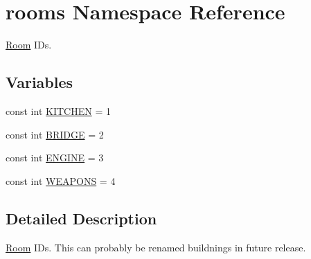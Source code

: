 \hypertarget{namespacerooms}{\section{rooms Namespace Reference}
\label{namespacerooms}
}


\hyperlink{classRoom}{Room} I\-Ds.  


\subsection*{Variables}
\begin{DoxyCompactItemize}
\item 
const int \hyperlink{namespacerooms_af442e0eb93ff764fd8719778cf57198c}{K\-I\-T\-C\-H\-E\-N} = 1
\item 
const int \hyperlink{namespacerooms_af6e6156e1e069732b4a871a08c0a0764}{B\-R\-I\-D\-G\-E} = 2
\item 
const int \hyperlink{namespacerooms_adb86c88291085e8000065eb5ded8d372}{E\-N\-G\-I\-N\-E} = 3
\item 
const int \hyperlink{namespacerooms_a70b442e599b3d5be772a5288cfc8ce71}{W\-E\-A\-P\-O\-N\-S} = 4
\end{DoxyCompactItemize}


\subsection{Detailed Description}
\hyperlink{classRoom}{Room} I\-Ds. This can probably be renamed buildnings in future release. 


